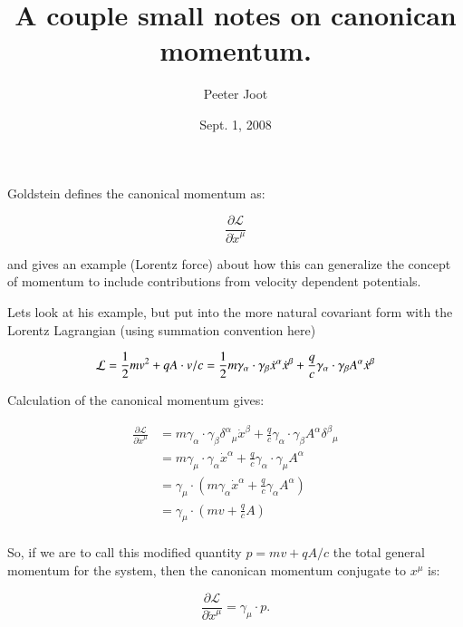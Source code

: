 \documentclass{article}
\title{ A couple small notes on canonican momentum.}
\author{Peeter Joot}
\date{ Sept. 1, 2008}
\newcommand{\xdot}[0]{\dot{x}}
\newcommand{\PD}[2]{\frac{\partial {#2}}{\partial {#1}}}
\newcommand{\LL}[0]{\mathcal{L}}
\begin{document}
\maketitle{}

\section{}

Goldstein defines the canonical momentum as:

\begin{equation*}
\PD{\xdot^{\mu}}{\LL}
\end{equation*}

and gives an example (Lorentz force) about how this can generalize the
concept of momentum to include contributions from velocity dependent 
potentials.

Lets look at his example, but put into the more natural covariant form
with the Lorentz Lagrangian (using summation convention here)

\begin{equation*}
\LL = \inv{2} m v^2 + q A \cdot v /c = 
\inv{2} m \gamma_{\alpha} \cdot \gamma_{\beta} \xdot^{\alpha} \xdot^{\beta}
+ \frac{q}{c} \gamma_{\alpha} \cdot \gamma_{\beta} A^{\alpha} \xdot^{\beta}
\end{equation*}

Calculation of the canonical momentum gives:

\begin{align*}
\PD{\xdot^{\mu}}{\LL} 
&=
m \gamma_{\alpha} \cdot \gamma_{\beta} {\delta^{\alpha}}_{\mu} \xdot^{\beta}
+ \frac{q}{c} \gamma_{\alpha} \cdot \gamma_{\beta} A^{\alpha} {\delta^{\beta}}_{\mu} \\
&=
m \gamma_{\mu} \cdot \gamma_{\alpha} \xdot^{\alpha}
+ \frac{q}{c} \gamma_{\alpha} \cdot \gamma_{\mu} A^{\alpha} \\
&=
\gamma_{\mu} \cdot \left( 
m \gamma_{\alpha} \xdot^{\alpha}
+ \frac{q}{c} \gamma_{\alpha} A^{\alpha}
\right) \\
&= \gamma_{\mu} \cdot \left( m v + \frac{q}{c} A \right) \\
\end{align*}

So, if we are to call this modified quantity $p = m v + q A / c$ the total general momentum for the system, then the canonican momentum conjugate to $x^{\mu}$ is:

\begin{equation*}
\PD{\xdot^{\mu}}{\LL} = \gamma_{\mu} \cdot p.
\end{equation*}
\end{document}
